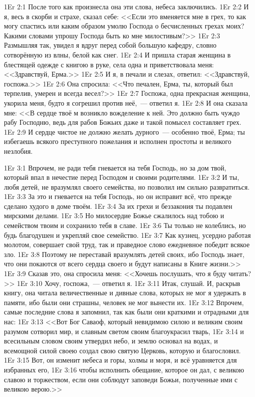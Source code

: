 \vs 1Er 2:1
После того как произнесла она эти слова, небеса заключились.
\vs 1Er 2:2
И я, весь в скорби и страхе, сказал себе:
<<Если это вменяется мне в грех, то как могу спастись или
каким образом умолю Господа о бесчисленных грехах моих?
Какими словами упрошу Господа быть ко мне милостивым?>>
\vs 1Er 2:3
Размышляя так, увидел я вдруг перед собой большую кафедру,
словно сотворённую из влны, белой как снег.
\vs 1Er 2:4
И пришла старая женщина в блестящей одежде с книгою в руке,
села одна и приветствовала меня:
<<Здравствуй, Ерма.>>
\vs 1Er 2:5
И я, в печали и слезах, ответил:
<<Здравствуй, госпожа.>>
\vs 1Er 2:6
Она спросила:
<<Что печален, Ерма, ты, который был терпелив, умерен и всегда весел?>>
\vs 1Er 2:7
Госпожа, одна прекрасная женщина, укорила меня,
будто я согрешил против неё,~--- ответил я.
\vs 1Er 2:8
И она сказала мне:
<<В сердце твоё м возникло вожделение к ней.
Это должно быть чуждо рабу Господню,
ведь для рабов Божьих даже и такой помысел составляет грех.
\vs 1Er 2:9
И сердце чистое не должно желать дурного~--- особенно твоё, Ерма;
ты избегаешь всякого преступного пожелания
и исполнен простоты и великого незлобия.

\vs 1Er 3:1
Впрочем, не ради тебя гневается на тебя Господь,
но за дом твой, который впал в нечестие перед
Господом и своими родителями.
\vs 1Er 3:2
И ты, любя детей, не вразумлял своего семейства,
но позволил им сильно развратиться.
\vs 1Er 3:3
За это и гневается на тебя Господь,
но он исправит всё, что прежде сделано худого в доме твоём.
\vs 1Er 3:4
За их грехи и беззакония ты подавлен мирскими делами.
\vs 1Er 3:5
Но милосердие Божье сжалилось над тобою и семейством твоим
и сохранило тебя в славе.
\vs 1Er 3:6
Ты только не колеблись, но будь благодушен и укрепляй свое семейство.
\vs 1Er 3:7
Как кузнец, усердно работая молотом,
совершает свой труд, так и праведное слово
ежедневное победит всякое зло.
\vs 1Er 3:8
Поэтому не переставай вразумлять детей своих,
ибо Господь знает, что они покаются от всего сердца
своего и будут написаны в Книге жизни.>>
\vs 1Er 3:9
Сказав это, она спросила меня:
<<Хочешь послушать, что я буду читать?>>
\vs 1Er 3:10
Хочу, госпожа,~--- ответил я.
\vs 1Er 3:11
Итак, слушай.
И, раскрыв книгу, она читала величественные и дивные слова,
которых не мог я удержать в памяти, ибо были они страшны,
человек не мог вынести их.
\vs 1Er 3:12
Впрочем, самые последние слова я запомнил,
так как были они краткими и отрадными для нас:
\vs 1Er 3:13
<<Вот Бог Саваоф, который невидимою силою
и великим своим разумом сотворил мир,
и славным светом своим благоукрасил тварь,
\vs 1Er 3:14
и всесильным словом своим утвердил небо,
и землю основал на водах, и всемощной силой своею создал свою
святую Церковь, которую и благословил.
\vs 1Er 3:15
Вот, он изменит небеса и горы, холмы и моря,
и всё уравняется для избранных его,
\vs 1Er 3:16
чтобы исполнить обещание, которое он дал,
с великою славою и торжеством, если они соблюдут заповеди
Божьи, полученные ими с великою верою.>>

